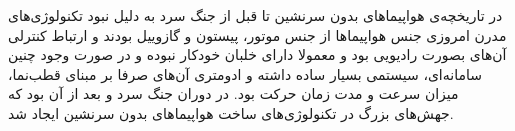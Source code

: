 
در تاریخچه‌ی هواپیماهای بدون سرنشین تا قبل از جنگ سرد به دلیل نبود تکنولوژی‌های مدرن امروزی جنس هواپیماها از جنس موتور، پیستون و گازوییل بودند و ارتباط کنترلی آن‌های بصورت رادیویی بود و معمولا دارای خلبان خودکار نبوده و در صورت وجود چنین سامانه‌ای، سیستمی بسیار ساده داشته و ادومتری آن‌های صرفا بر مبنای قطب‌نما، میزان سرعت و مدت زمان حرکت بود. در دوران جنگ سرد و بعد از آن بود که جهش‌های بزرگ در تکنولوژی‌های ساخت هواپیماهای بدون سرنشین ایجاد شد.